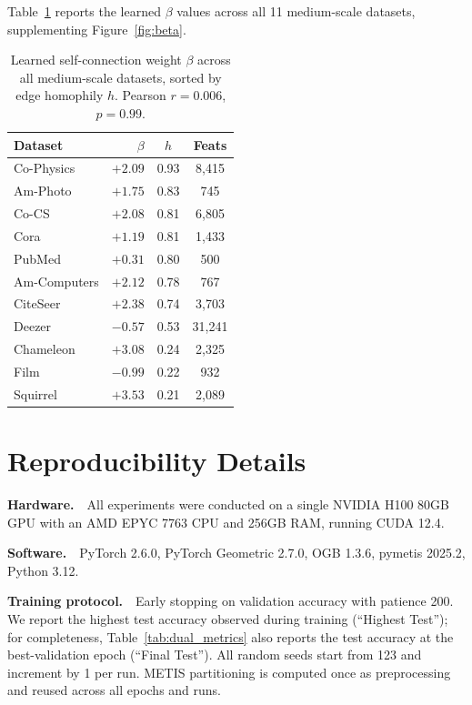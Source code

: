 \documentclass[manuscript, screen, review, anonymous]{acmart}
\begin{document}
Table~\ref{tab:beta_values} reports the learned $\beta$ values across all 11 medium-scale datasets, supplementing Figure~\ref{fig:beta}.

\begin{table}[t]
\caption{Learned self-connection weight $\beta$ across all medium-scale datasets, sorted by edge homophily $h$. Pearson $r = 0.006$, $p = 0.99$.}
\label{tab:beta_values}
\centering
\small
\begin{tabular}{l|rcc}
\toprule
\textbf{Dataset} & $\beta$ & $h$ & \textbf{Feats} \\
\midrule
Co-Physics   & $+2.09$ & 0.93 & 8,415 \\
Am-Photo     & $+1.75$ & 0.83 & 745 \\
Co-CS        & $+2.08$ & 0.81 & 6,805 \\
Cora         & $+1.19$ & 0.81 & 1,433 \\
PubMed       & $+0.31$ & 0.80 & 500 \\
Am-Computers & $+2.12$ & 0.78 & 767 \\
CiteSeer     & $+2.38$ & 0.74 & 3,703 \\
\midrule
Deezer       & $-0.57$ & 0.53 & 31,241 \\
Chameleon    & $+3.08$ & 0.24 & 2,325 \\
Film         & $-0.99$ & 0.22 & 932 \\
Squirrel     & $+3.53$ & 0.21 & 2,089 \\
\bottomrule
\end{tabular}
\end{table}

\section{Reproducibility Details}
\label{app:reproducibility}

\textbf{Hardware.}~~All experiments were conducted on a single NVIDIA H100 80GB GPU with an AMD EPYC 7763 CPU and 256GB RAM, running CUDA 12.4.

\textbf{Software.}~~PyTorch 2.6.0, PyTorch Geometric 2.7.0, OGB 1.3.6, pymetis 2025.2, Python 3.12.

\textbf{Training protocol.}~~Early stopping on validation accuracy with patience 200. We report the highest test accuracy observed during training (``Highest Test''); for completeness, Table~\ref{tab:dual_metrics} also reports the test accuracy at the best-validation epoch (``Final Test''). All random seeds start from 123 and increment by 1 per run. METIS partitioning is computed once as preprocessing and reused across all epochs and runs.
\end{document}
